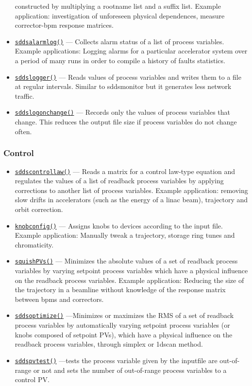 \documentclass[11pt]{article}
\newcommand{\progref}[1]{\hyperref[#1]{\texttt{#1()}}}
\begin{document}
\begin{itemize}
        constructed by multiplying a rootname list and a suffix list.  Example
        application: investigation of unforeseen physical dependences, measure
        corrector-bpm response matrices.
\item \progref{sddsalarmlog} --- Collects alarm status of a list of process variables.
        Example applications: Logging alarms for a particular accelerator system over a period of
        many runs in order to compile a history of faults statistics.
\item \progref{sddslogger} --- Reads values of process variables and writes them to a file at regular intervals. Similar to sddsmonitor but it generates less network traffic.
\item \progref{sddslogonchange} --- Records only the values of process variables that change. This reduces the output file size if process variables do not change often.
\end{itemize}

\subsubsection{Control}
\begin{itemize}
\item \progref{sddscontrollaw} --- Reads a matrix for a control law-type equation and regulates the
values of a list of readback process variables by applying corrections to another list of process variables. 
        Example application: removing slow drifts in accelerators (such as the energy of a linac beam), trajectory
        and orbit correction.
\item \progref{knobconfig} --- Assigns knobs to devices according to the input file.
        Example application: Manually tweak a trajectory, storage ring tunes and chromaticity.
\item \progref{squishPVs} --- Minimizes the absolute values of a set of readback process variables 
        by varying setpoint process variables which have a physical influence on the readback process variables.
        Example application: Reducing the size of the trajectory in a beamline without knowledge of the
        response matrix between bpms and correctors.
\item \progref{sddsoptimize} ---Minimizes or maximizes the RMS of a set of readback process variables by automatically varying setpoint process variables (or knobs composed of setpoint PVs), which have a physical influence on the readback process variables, through simplex or 1dscan method.
\item \progref{sddspvtest} ---tests the process variable given by the inputfile are out-of-range or not and sets the number of out-of-range process variables to a control PV.
\end{itemize}
\end{document}
